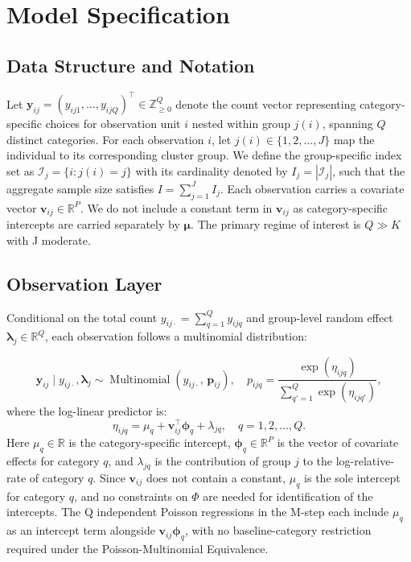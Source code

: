 \documentclass[]{report}
\theoremstyle{definition}
\begin{document}
\chapter{Model Specification}

\section{Data Structure and Notation}
    Let $\bm{y}_{ij} = (y_{ij1}, \dots, y_{ijQ})^\top \in \mathbb{Z}_{\geq 0}^Q$ denote the count vector representing category-specific choices for observation unit $i$ nested within group $j(i)$, spanning $Q$ distinct categories. For each observation $i$, let $j(i) \in \{1, 2, \ldots, J\}$ map the individual to its corresponding cluster group. We define the group-specific index set as $\mathcal{I}_j = \{i : j(i) = j\}$ with its cardinality denoted by $I_j = |\mathcal{I}_j|$, such that the aggregate sample size satisfies $I = \sum_{j=1}^J I_j$. Each observation carries a covariate vector $\bm{v}_{ij}\in \mathbb{R}^{P}$. We do not include a constant term in $\bm{v}_{ij}$ as category-specific intercepts are carried separately by $\bm{\mu}$. The primary regime of interest is $Q \gg K$ with J moderate.

\section{Observation Layer}
    Conditional on the total count $y_{ij\cdot}=\sum_{q=1}^{Q}y_{ijq}$ and group-level random effect $\bm{\lambda}_{j}\in \mathbb{R}^{Q}$, each observation follows a multinomial distribution:

\begin{equation}
    \bm{y}_{ij} \mid  y_{ij\cdot} , \bm{\lambda}_{j}
    \sim \operatorname{Multinomial}\left(y_{ij\cdot},\, \bm{p}_{ij}\right), \quad p_{ijq}=\frac{\exp(\eta_{ijq})}{\sum_{q'=1}^{Q}\exp(\eta_{ijq'})},
\end{equation}
where the log-linear predictor is:
\begin{equation}
    \eta_{ijq}=\mu_{q}+\bm{v}_{ij}^{\top}\bm{\phi}_{q}+\lambda_{jq}, \quad q=1,2,\dots, Q.
\end{equation}
    Here $\mu_{q}\in\mathbb{R}$ is the category-specific intercept, $\bm{\phi}_{q}\in\mathbb{R}^{P}$ is the vector of covariate effects for category $q$, and $\lambda_{jq}$ is the contribution of group $j$ to the log-relative-rate of category $q$. Since $\bm{v}_{ij}$ does not contain a constant, $\mu_{q}$ is the sole intercept for category $q$, and no constraints on $\Phi$ are needed for identification of the intercepts. The Q independent Poisson regressions in the M-step each include $\mu_{q}$ as an intercept term alongside $\bm{v}_{ij}\bm{\phi}_{q}$, with no baseline-category restriction required under the Poisson-Multinomial Equivalence.
\end{document}
